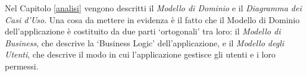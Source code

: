 Nel Capitolo \ref{analisi} vengono descritti il \textsl{Modello di Dominio} e il \textsl{Diagramma dei Casi d'Uso}. Una cosa da mettere in evidenza è il fatto che il Modello di Dominio dell'applicazione è costituito da due parti \textquoteleft ortogonali' tra loro: il \textsl{Modello di Business}, che descrive la \textquoteleft Business Logic' dell'applicazione, e il \textsl{Modello degli Utenti}, che descrive il modo in cui l'applicazione gestisce gli utenti e i loro permessi.